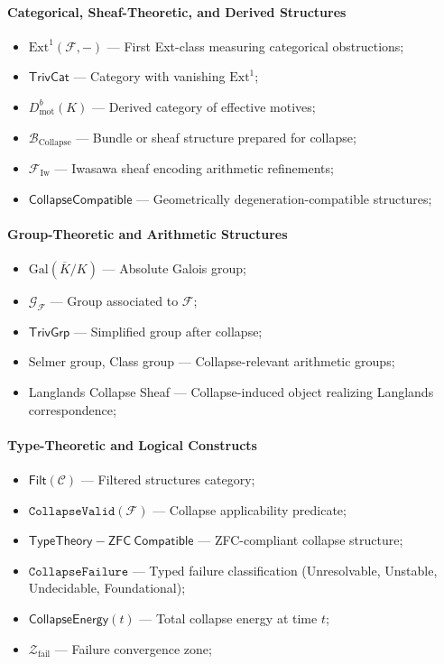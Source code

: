 \documentclass[11pt]{article}
\begin{document}
\paragraph{Categorical, Sheaf-Theoretic, and Derived Structures}
\begin{itemize}
    \item $\mathrm{Ext}^1(\mathcal{F}, -)$ — First Ext-class measuring categorical obstructions;
    \item $\mathsf{TrivCat}$ — Category with vanishing $\mathrm{Ext}^1$;
    \item $D^b_{\mathrm{mot}}(K)$ — Derived category of effective motives;
    \item $\mathcal{B}_{\mathrm{Collapse}}$ — Bundle or sheaf structure prepared for collapse;
    \item $\mathcal{F}_{\mathrm{Iw}}$ — Iwasawa sheaf encoding arithmetic refinements;
    \item $\mathsf{CollapseCompatible}$ — Geometrically degeneration-compatible structures;
\end{itemize}

\paragraph{Group-Theoretic and Arithmetic Structures}
\begin{itemize}
    \item $\mathrm{Gal}(\overline{K}/K)$ — Absolute Galois group;
    \item $\mathcal{G}_{\mathcal{F}}$ — Group associated to $\mathcal{F}$;
    \item $\mathsf{TrivGrp}$ — Simplified group after collapse;
    \item Selmer group, Class group — Collapse-relevant arithmetic groups;
    \item Langlands Collapse Sheaf — Collapse-induced object realizing Langlands correspondence;
\end{itemize}

\paragraph{Type-Theoretic and Logical Constructs}
\begin{itemize}
    \item $\mathsf{Filt}(\mathcal{C})$ — Filtered structures category;
    \item $\texttt{CollapseValid}(\mathcal{F})$ — Collapse applicability predicate;
    \item $\mathsf{TypeTheory{-}ZFC\ Compatible}$ — ZFC-compliant collapse structure;
    \item $\texttt{CollapseFailure}$ — Typed failure classification (Unresolvable, Unstable, Undecidable, Foundational);
    \item $\mathsf{CollapseEnergy}(t)$ — Total collapse energy at time $t$;
    \item $\mathcal{Z}_{\mathrm{fail}}$ — Failure convergence zone;
\end{itemize}
\end{document}
